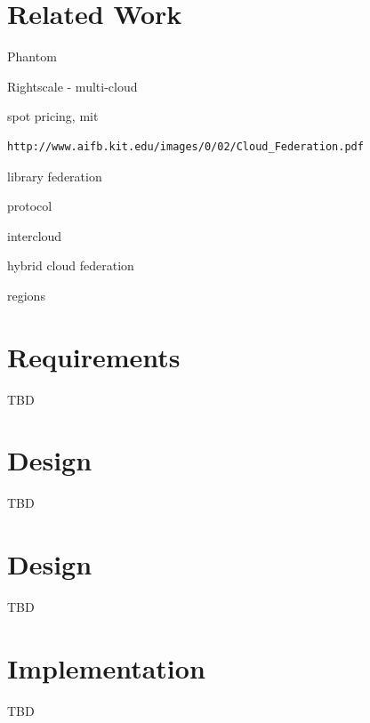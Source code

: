 \documentclass{tex/sig-alternate}
\begin{document}
\section{Related Work}

Phantom 

Rightscale - multi-cloud

spot pricing, mit 

\begin{verbatim}
http://www.aifb.kit.edu/images/0/02/Cloud_Federation.pdf
\end{verbatim}

library federation

protocol

intercloud

hybrid cloud federation

regions

\section{Requirements}

TBD

\section{Design}

TBD
\section{Design}

TBD

\section{Implementation}

TBD

\end{document}
